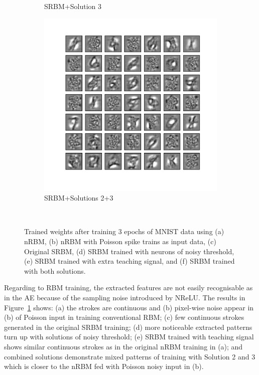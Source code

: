 \begin{figure}
\begin{subfigure}[t]{0.4\textwidth}
		\caption{SRBM+Solution 3}
	\end{subfigure}
	\begin{subfigure}[t]{0.4\textwidth}
		\includegraphics[width=\textwidth]{pics_sdlm/53_MNIST_SRBM_all/2_60000_0.pdf}
		\caption{SRBM+Solutions 2+3}
	\end{subfigure}\\
	\caption{Trained weights after training 3 epochs of MNIST data using (a) nRBM, (b) nRBM with Poisson spike trains as input data, (c) Original SRBM, (d) SRBM trained with neurons of noisy threshold, (e) SRBM trained with extra teaching signal, and (f) SRBM trained with both solutions.}
	\label{fig:weights_rbm}
\end{figure}

Regarding to RBM training, the extracted features are not easily recognisable as in the AE because of the sampling noise introduced by NReLU.
The results in Figure~\ref{fig:weights_rbm} shows: (a) the strokes are continuous and (b) pixel-wise noise appear in (b) of Poisson input in training conventional RBM;
(c) few continuous strokes generated in the original SRBM training;
(d) more noticeable extracted patterns turn up with solutions of noisy threshold;
(e) SRBM trained with teaching signal shows similar continuous strokes as in the original nRBM training in (a);
and combined solutions demonstrate mixed patterns of training with Solution 2 and 3 which is closer to the nRBM fed with Poisson noisy input in (b). 


